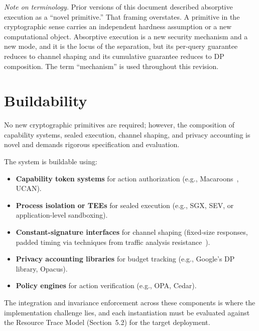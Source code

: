 \documentclass[11pt,a4paper]{article}
\begin{document}
\textit{Note on terminology.} Prior versions of this document described absorptive execution as a ``novel primitive.'' That framing overstates. A primitive in the cryptographic sense carries an independent hardness assumption or a new computational object. Absorptive execution is a new security mechanism and a new mode, and it is the locus of the separation, but its per-query guarantee reduces to channel shaping and its cumulative guarantee reduces to DP composition. The term ``mechanism'' is used throughout this revision.

\section{Buildability}\label{sec:buildability}

No new cryptographic primitives are required; however, the composition of capability systems, sealed execution, channel shaping, and privacy accounting is novel and demands rigorous specification and evaluation.

The system is buildable using:
\begin{itemize}
  \item \textbf{Capability token systems} for action authorization (e.g., Macaroons~\cite{birgisson2014macaroons}, UCAN).
  \item \textbf{Process isolation or TEEs} for sealed execution (e.g., SGX, SEV, or application-level sandboxing).
  \item \textbf{Constant-signature interfaces} for channel shaping (fixed-size responses, padded timing via techniques from traffic analysis resistance~\cite{dyer2012peekaboo}).
  \item \textbf{Privacy accounting libraries} for budget tracking (e.g., Google's DP library, Opacus).
  \item \textbf{Policy engines} for action verification (e.g., OPA, Cedar).
\end{itemize}

The integration and invariance enforcement across these components is where the implementation challenge lies, and each instantiation must be evaluated against the Resource Trace Model (Section~5.2) for the target deployment.

\end{document}
